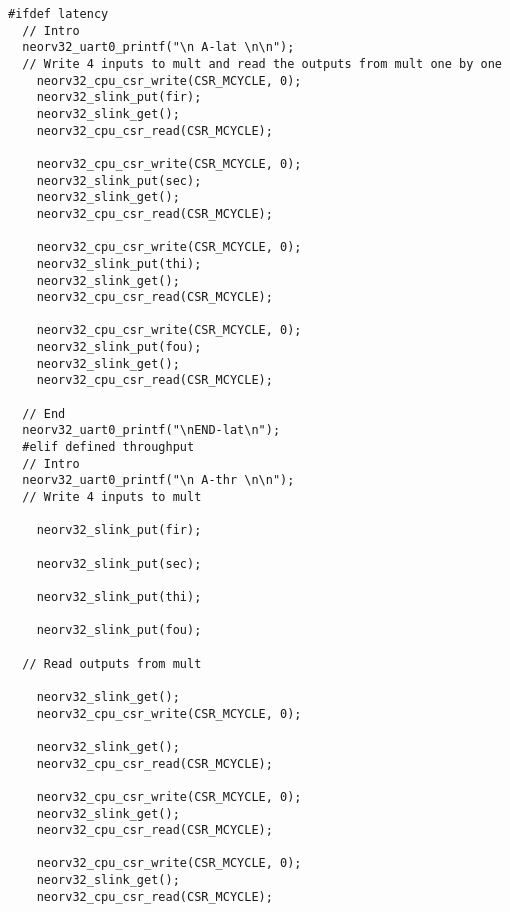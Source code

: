 \begin{code}
\begin{verbatim}
#ifdef latency
  // Intro
  neorv32_uart0_printf("\n A-lat \n\n");
  // Write 4 inputs to mult and read the outputs from mult one by one
    neorv32_cpu_csr_write(CSR_MCYCLE, 0);
    neorv32_slink_put(fir);
    neorv32_slink_get();
    neorv32_cpu_csr_read(CSR_MCYCLE); 

    neorv32_cpu_csr_write(CSR_MCYCLE, 0);
    neorv32_slink_put(sec);
    neorv32_slink_get();
    neorv32_cpu_csr_read(CSR_MCYCLE); 

    neorv32_cpu_csr_write(CSR_MCYCLE, 0);
    neorv32_slink_put(thi);
    neorv32_slink_get();
    neorv32_cpu_csr_read(CSR_MCYCLE); 

    neorv32_cpu_csr_write(CSR_MCYCLE, 0);
    neorv32_slink_put(fou);
    neorv32_slink_get();
    neorv32_cpu_csr_read(CSR_MCYCLE); 

  // End
  neorv32_uart0_printf("\nEND-lat\n");
  #elif defined throughput
  // Intro
  neorv32_uart0_printf("\n A-thr \n\n");
  // Write 4 inputs to mult

    neorv32_slink_put(fir);

    neorv32_slink_put(sec);

    neorv32_slink_put(thi);

    neorv32_slink_put(fou);

  // Read outputs from mult

    neorv32_slink_get();
    neorv32_cpu_csr_write(CSR_MCYCLE, 0);

    neorv32_slink_get();
    neorv32_cpu_csr_read(CSR_MCYCLE); 

    neorv32_cpu_csr_write(CSR_MCYCLE, 0);
    neorv32_slink_get();
    neorv32_cpu_csr_read(CSR_MCYCLE);

    neorv32_cpu_csr_write(CSR_MCYCLE, 0);
    neorv32_slink_get();
    neorv32_cpu_csr_read(CSR_MCYCLE);


\end{verbatim}
\end{code}
